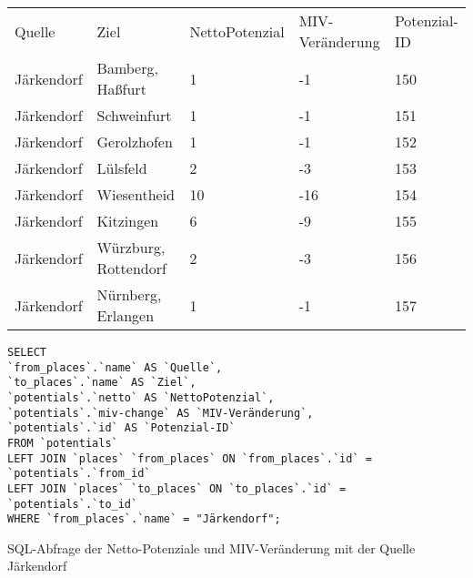 \begin{tabular}{ l  l  l  l  l }
Quelle & Ziel & NettoPotenzial & MIV-Veränderung & Potenzial-ID\\ 
Järkendorf & Bamberg, Haßfurt & 1 & -1 & 150\\ 
Järkendorf & Schweinfurt & 1 & -1 & 151\\ 
Järkendorf & Gerolzhofen & 1 & -1 & 152\\ 
Järkendorf & Lülsfeld & 2 & -3 & 153\\ 
Järkendorf & Wiesentheid & 10 & -16 & 154\\ 
Järkendorf & Kitzingen & 6 & -9 & 155\\ 
Järkendorf & Würzburg, Rottendorf & 2 & -3 & 156\\ 
Järkendorf & Nürnberg, Erlangen & 1 & -1 & 157\\ 
\end{tabular}
\newline
\newline
\begin{listing}[htbp]
\begin{verbatim}
SELECT
`from_places`.`name` AS `Quelle`, 
`to_places`.`name` AS `Ziel`, 
`potentials`.`netto` AS `NettoPotenzial`, 
`potentials`.`miv-change` AS `MIV-Veränderung`, 
`potentials`.`id` AS `Potenzial-ID`
FROM `potentials`
LEFT JOIN `places` `from_places` ON `from_places`.`id` = `potentials`.`from_id`
LEFT JOIN `places` `to_places` ON `to_places`.`id` = `potentials`.`to_id`
WHERE `from_places`.`name` = "Järkendorf";
\end{verbatim}
\caption{SQL-Abfrage der Netto-Potenziale und MIV-Veränderung mit der Quelle Järkendorf}\label{lst-fz-jaerkendorf}
\end{listing}